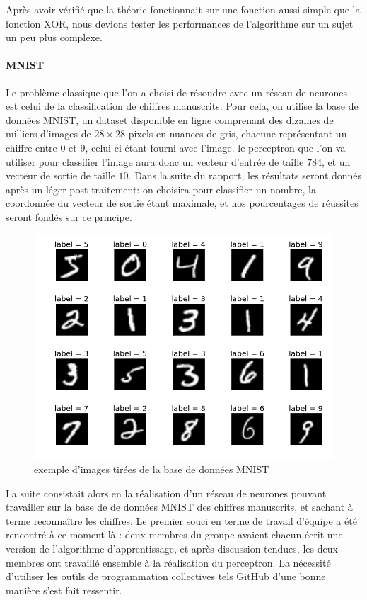\documentclass[
    10pt,
    a4paper,
    oneside,
    headinclude,footinclude,
    BCOR=5mm,
    captions=tableabove
]{scrartcl}
\begin{document}
Après avoir vérifié que la théorie fonctionnait sur une fonction aussi simple que la fonction XOR, nous devions tester les performances de l'algorithme sur un sujet un peu plus complexe.

\paragraph{MNIST}
Le problème classique que l'on a choisi de résoudre avec un réseau de neurones est celui de la classification de chiffres manuscrits. Pour cela, on utilise la base de données MNIST, un dataset disponible en ligne comprenant des dizaines de milliers d'images de $28\times 28$ pixels en nuances de gris, chacune représentant un chiffre entre $0$ et $9$, celui-ci étant fourni avec l'image. le perceptron que l'on va utiliser pour classifier l'image aura donc un vecteur d'entrée de taille $784$, et un vecteur de sortie de taille $10$. Dans la suite du rapport, les résultats seront donnés après un léger post-traitement: on choisira pour classifier un nombre, la coordonnée du vecteur de sortie étant maximale, et nos pourcentages de réussites seront fondés sur ce principe.

\begin{figure}[h!]
\includegraphics[width=0.8 \linewidth]{MNIST.png}
\centering
\caption{exemple d'images tirées de la base de données MNIST}
\label{fig:MNIST}
\end{figure}

La suite consistait alors en la réalisation d'un réseau de neurones pouvant travailler sur la base de de données MNIST des chiffres manuscrits, et sachant à terme reconnaître les chiffres. Le premier souci en terme de travail d'équipe a été rencontré à ce moment-là : deux membres du groupe avaient chacun écrit une version de l'algorithme d'apprentissage, et après discussion tendues, les deux membres ont travaillé ensemble à la réalisation du perceptron. La nécessité d'utiliser les outils de programmation collectives tels GitHub d'une bonne manière s'est fait ressentir.
\end{document}
